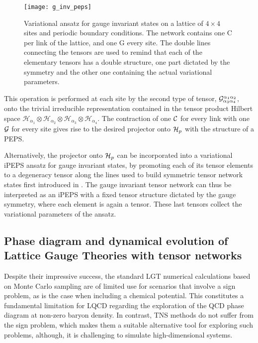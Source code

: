 \documentclass[epj,final]{svjour}
\begin{document}
\begin{figure}
\begin{center}
\texttt{[image: g\_inv\_peps]}
\caption{Variational ansatz for gauge invariant states on a lattice of $4\times 4$ sites and periodic boundary conditions. The network contains one {\cal C} per link of the lattice, and one {\cal G} every site. The double lines connecting the tensors are used to remind that each of the elementary tensors has a double structure, one part dictated by the symmetry and the other one containing the actual variational parameters.}
\label{gip}
\end{center}
\end{figure}

This operation is performed at each site by the second type of tensor, ${\cal G}^{\alpha_1 \alpha_2}_{ \alpha_3 \alpha_4}$, onto the trivial irreducible representation contained in the tensor product Hilbert space $\mathcal{H}_{\alpha_1}\otimes\mathcal{H}_{\alpha_2}\otimes\mathcal{H}_{\alpha_3}\otimes \mathcal{H}_{\alpha_4}$. The contraction of one $\cal{C}$ for every link with one $\cal{G}$ for every site gives rise to the desired projector onto ${\cal H}_p$ with the structure of a PEPS.

Alternatively, the projector onto ${\cal H}_p$ can be incorporated into a variational iPEPS ansatz for gauge invariant states, by promoting each of its tensor elements to a degeneracy tensor along the lines used to build symmetric tensor network states first introduced in \cite{singh_tensor_2009}. The gauge invariant tensor network can thus be interpreted as an iPEPS with a fixed tensor structure dictated by the gauge symmetry, where each element is again a tensor. These last tensors collect the variational parameters of the ansatz.

\subsection{Phase diagram and dynamical evolution of Lattice Gauge Theories with tensor networks}

Despite their impressive success, the standard LGT numerical calculations based on Monte Carlo sampling are of limited use for scenarios that involve a sign problem, as is the case when including a chemical potential. This constitutes a fundamental limitation for LQCD regarding the exploration of the QCD phase diagram at non-zero baryon density. In contrast, TNS methods do not suffer from the sign problem, which makes them a suitable alternative tool for exploring such problems, although, it is challenging to simulate high-dimensional systems.
\end{document}
